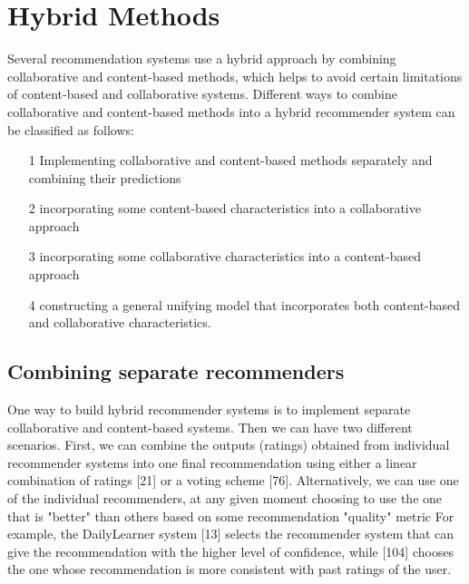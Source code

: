 \section{Hybrid Methods}
Several recommendation systems use a hybrid approach by combining collaborative and content-based methods, which helps to avoid certain limitations of content-based and collaborative systems. Different ways to combine collaborative and content-based methods into a hybrid recommender system can be classified as follows:
\begin{itemize}
\item [1] Implementing collaborative and content-based methods separately and combining their predictions
\item [2] incorporating some content-based characteristics into a collaborative approach
\item [3] incorporating some collaborative characteristics into a content-based approach
\item [4] constructing a general unifying model that incorporates both content-based and collaborative characteristics.
\end{itemize}

\subsection{Combining separate recommenders}
One way to build hybrid recommender systems is to implement separate collaborative and content-based systems. Then we can have two different scenarios.
First, we can combine the outputs (ratings) obtained from individual recommender systems into one final recommendation using either a linear combination of ratings [21] or a voting scheme [76]. 
Alternatively, we can use one of the individual recommenders, at any given moment choosing to use the one that is "better" than others based on some recommendation "quality" metric 
For example, the DailyLearner system [13] selects the recommender system that can give the recommendation with the higher level of confidence, while [104] chooses the one whose recommendation is more consistent with past ratings of the user.

